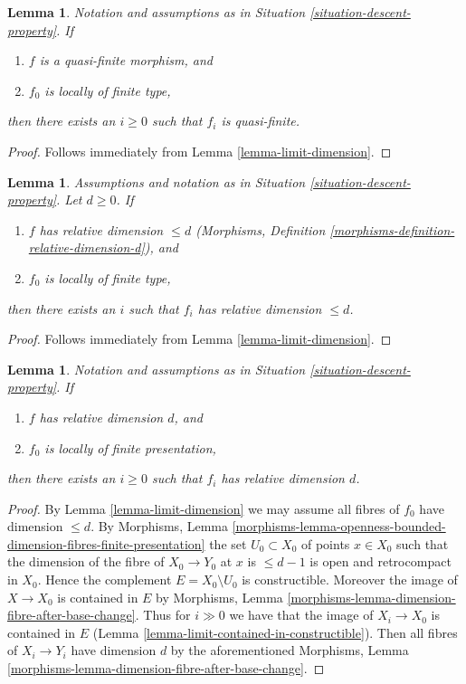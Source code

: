 \documentclass{stacks-project}
\theoremstyle{plain}
\newtheorem{lemma}[subsection]{Lemma}
\theoremstyle{definition}
\theoremstyle{remark}
\numberwithin{equation}{subsection}
\begin{document}
\begin{lemma}
\label{lemma-descend-quasi-finite}
Notation and assumptions as in Situation \ref{situation-descent-property}.
If
\begin{enumerate}
\item $f$ is a quasi-finite morphism, and
\item $f_0$ is locally of finite type,
\end{enumerate}
then there exists an $i \geq 0$ such that $f_i$ is quasi-finite.
\end{lemma}

\begin{proof}
Follows immediately from Lemma \ref{lemma-limit-dimension}.
\end{proof}

\begin{lemma}
\label{lemma-eventually-relative-dimension}
Assumptions and notation as in Situation \ref{situation-descent-property}.
Let $d \geq 0$. If
\begin{enumerate}
\item $f$ has relative dimension $\leq d$
(Morphisms, Definition \ref{morphisms-definition-relative-dimension-d}), and
\item $f_0$ is locally of finite type,
\end{enumerate}
then there exists an $i$ such that $f_i$ has relative dimension $\leq d$.
\end{lemma}

\begin{proof}
Follows immediately from Lemma \ref{lemma-limit-dimension}.
\end{proof}

\begin{lemma}
\label{lemma-descend-dimension-d}
Notation and assumptions as in Situation \ref{situation-descent-property}.
If
\begin{enumerate}
\item $f$ has relative dimension $d$, and
\item $f_0$ is locally of finite presentation,
\end{enumerate}
then there exists an $i \geq 0$ such that $f_i$
has relative dimension $d$.
\end{lemma}

\begin{proof}
By Lemma \ref{lemma-limit-dimension} we may assume all fibres
of $f_0$ have dimension $\leq d$. By Morphisms, Lemma
\ref{morphisms-lemma-openness-bounded-dimension-fibres-finite-presentation}
the set $U_0 \subset X_0$ of points $x \in X_0$ such that
the dimension of the fibre of $X_0 \to Y_0$ at $x$ is $\leq d - 1$
is open and retrocompact in $X_0$. Hence the complement
$E = X_0 \setminus U_0$ is constructible.
Moreover the image of $X \to X_0$ is contained in $E$
by Morphisms, Lemma \ref{morphisms-lemma-dimension-fibre-after-base-change}.
Thus for $i \gg 0$ we have that the image
of $X_i \to X_0$ is contained in $E$
(Lemma \ref{lemma-limit-contained-in-constructible}). Then all fibres
of $X_i \to Y_i$ have dimension $d$ by the aforementioned
Morphisms, Lemma \ref{morphisms-lemma-dimension-fibre-after-base-change}.
\end{proof}
\end{document}
